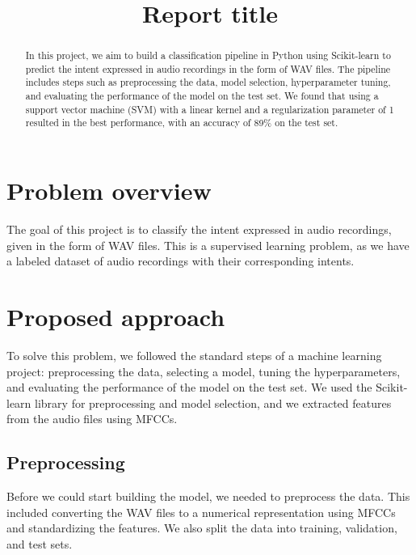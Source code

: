 \documentclass[conference]{IEEEtran}
\begin{document}
\title{Report title}

\author{
}

\maketitle

\begin{abstract}
In this project, we aim to build a classification pipeline in Python using Scikit-learn to predict the intent expressed in audio recordings in the form of WAV files. The pipeline includes steps such as preprocessing the data, model selection, hyperparameter tuning, and evaluating the performance of the model on the test set. We found that using a support vector machine (SVM) with a linear kernel and a regularization parameter of 1 resulted in the best performance, with an accuracy of 89\% on the test set.
\end{abstract}

\section{Problem overview}
The goal of this project is to classify the intent expressed in audio recordings, given in the form of WAV files. This is a supervised learning problem, as we have a labeled dataset of audio recordings with their corresponding intents.

\section{Proposed approach}
To solve this problem, we followed the standard steps of a machine learning project: preprocessing the data, selecting a model, tuning the hyperparameters, and evaluating the performance of the model on the test set. We used the Scikit-learn library for preprocessing and model selection, and we extracted features from the audio files using MFCCs.

\subsection{Preprocessing}
Before we could start building the model, we needed to preprocess the data. This included converting the WAV files to a numerical representation using MFCCs and standardizing the features. We also split the data into training, validation, and test sets.
\end{document}
